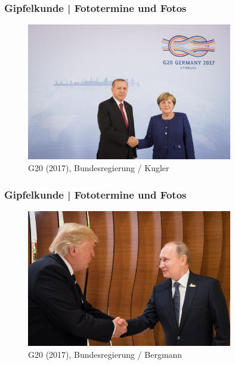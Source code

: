 \documentclass[]{beamer}
\begin{document}
	\begin{frame}
	\frametitle{Gipfelkunde | Fototermine und Fotos}
	\begin{figure}[h!]
		\renewcommand{\figurename}{Foto} 
		\includegraphics[width=0.8\textwidth]{images/fotos_03_BundesregierungKugler}
		\caption{G20 (2017), Bundesregierung / Kugler}
	\end{figure}
	\end{frame}

	\begin{frame}
	\frametitle{Gipfelkunde | Fototermine und Fotos}	
	\begin{figure}[h!]
		\renewcommand{\figurename}{Foto} 
		\includegraphics[width=0.8\textwidth]{images/fotos_04_BundesregierungBergmann}
		\caption{G20 (2017), Bundesregierung / Bergmann}
	\end{figure}
	\end{frame}
\end{document}

